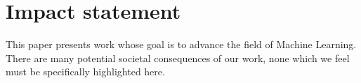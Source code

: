 \section{Impact statement}

This paper presents work whose goal is to advance the field of Machine Learning. There are many potential societal consequences of our work, none which we feel must be specifically highlighted here.

\ifisicml

\else

\fi

